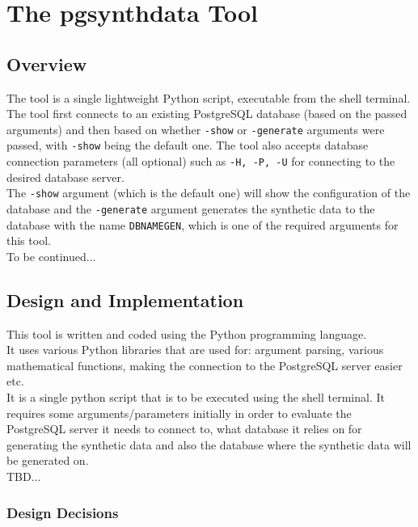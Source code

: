 \chapter{The pgsynthdata Tool}
\label{ch:pgsynthdata_tool}
\section{Overview}
The tool is a single lightweight Python script, executable from the shell terminal. The tool first connects to an existing PostgreSQL database (based on the passed arguments) and then based on whether \texttt{-show} or \texttt{-generate} arguments were passed, with \texttt{-show} being the default one. The tool also accepts database connection parameters (all optional) such as \texttt{-H, -P, -U} for connecting to the desired database server.\\
The \texttt{-show} argument (which is the default one) will show the configuration of the database and the \texttt{-generate} argument generates the synthetic data to the database with the name \texttt{DBNAMEGEN}, which is one of the required arguments for this tool.\\
To be continued...
\section{Design and Implementation}
This tool is written and coded using the Python programming language.\\
It uses various Python libraries that are used for: argument parsing, various mathematical functions, making the connection to the PostgreSQL server easier etc.\\
It is a single python script that is to be executed using the shell terminal. It requires some arguments/parameters initially in order to evaluate the PostgreSQL server it needs to connect to, what database it relies on for generating the synthetic data and also the database where the synthetic data will be generated on.\\
TBD...
\subsection{Design Decisions}

